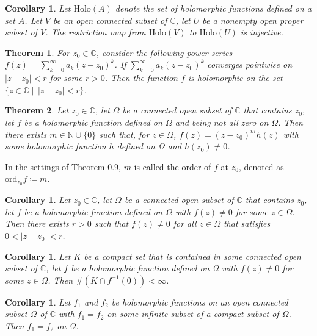 \documentclass[9pt]{article}
\theoremstyle{break}
\theoremstyle{break}
\newtheorem{thm}{Theorem}[section]
\newtheorem{corT}[lem]{Corollary}
\newcommand{\N}{\mathbb{N}}
\newcommand{\Complex}{\mathbb{C}}
\begin{document}
\begin{corT}
Let $\text{Holo}(A)$ denote the set of holomorphic functions defined on a set $A$. Let $V$ be an open connected subset of $\Complex$, let $U$ be a nonempty open proper subset of $V$. The restriction map from $\text{Holo}(V)$ to $\text{Holo}(U)$ is injective.
\end{corT}


\begin{thm}
For $z_0 \in \Complex$, consider the following power series $f(z) = \sum_{k=0}^\infty a_k(z-z_0)^k $. If $\sum_{k=0}^\infty a_k(z-z_0)^k$ converges pointwise on $|z-z_0| <r$ for some $r >0$. Then the function $f$ is holomorphic on the set $\{ z \in \Complex \mid \, |z-z_0|<r\}$. 
\end{thm}

\begin{thm}
Let $z_0 \in \Complex$, let $\Omega$ be a connected open subset of $\Complex$ that contains $z_0$, let $f$ be a holomorphic function defined on $\Omega$ and being not all zero on $\Omega$. Then there exists $m \in \N\cup\{0\}$ such that, for $z \in \Omega$, $f(z) = (z-z_0)^m h(z)$ with some holomorphic function $h$ defined on $\Omega$ and $h(z_0) \neq 0$. 
\end{thm}

In the settings of Theorem 0.9, $m$ is called the order of $f$ at $z_0$, denoted as $\text{ord}_{z_0}f \coloneqq m$.


\begin{corT}
Let $z_0 \in \Complex$, let $\Omega$ be a connected open subset of $\Complex$ that contains $z_0$, let $f$ be a holomorphic function defined on $\Omega$ with $f(z) \neq 0$ for some $z \in \Omega$. Then there exists $r>0$ such that $f(z) \neq 0$ for all $z \in \Omega$ that satisfies $0<|z-z_0|<r$. 
\end{corT}


\begin{corT}
Let $K$ be a compact set that is contained in some connected open subset of $\Complex$, let $f$ be a holomorphic function defined on $\Omega$ with $f(z) \neq 0$ for some $z\in \Omega$. Then $\#(K\cap f^{-1}(0)) < \infty$. 
\end{corT}

\begin{corT}
Let $f_1$ and $f_2$ be holomorphic functions on an open connected subset $\Omega$ of $\Complex$ with $f_1 = f_2$ on some infinite subset of a compact subset of $\Omega$. Then $f_1 = f_2$ on $\Omega$. 
\end{corT}
\end{document}
